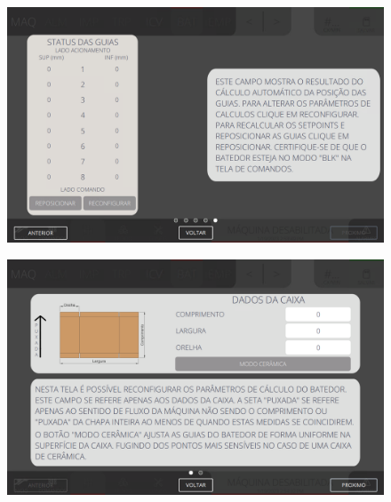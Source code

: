 \newpage
\thispagestyle{fancy}
\vspace{\fill}
\begin{figure}
    \centering
    \includegraphics[width=576 px,height=360 px]{src/imagesICV/07-scout/settings/e-5.png}
\end{figure}

\newpage
\thispagestyle{fancy}
\vspace{\fill}
\begin{figure}
    \centering
    \includegraphics[width=576 px,height=360 px]{src/imagesICV/07-scout/settings/e-6.png}
\end{figure}


